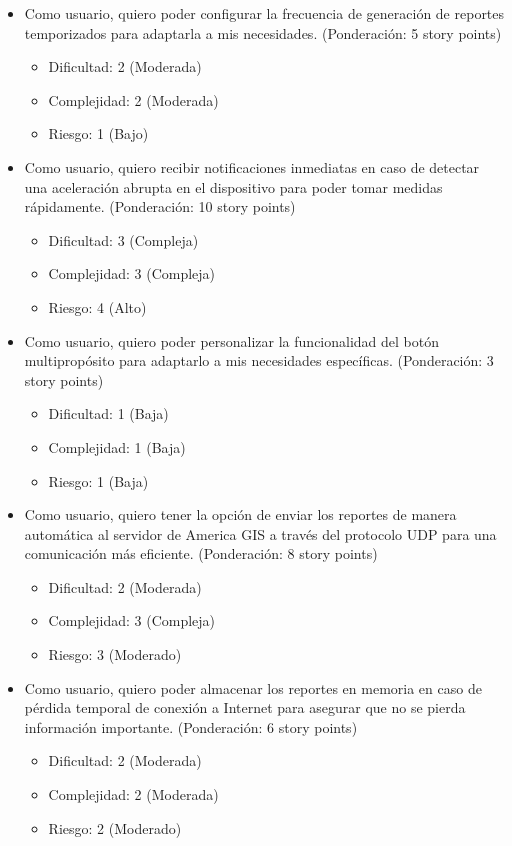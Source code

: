 \documentclass[
11pt, %
codirector, %
]{charter}
\begin{document}
\begin{itemize}
    \item Como usuario, quiero poder configurar la frecuencia de generación de reportes temporizados para adaptarla a mis necesidades. (Ponderación: 5 story points)
    \begin{itemize}
        \item Dificultad: 2 (Moderada)
        \item Complejidad: 2 (Moderada)
        \item Riesgo: 1 (Bajo)
    \end{itemize}    
    
    \item Como usuario, quiero recibir notificaciones inmediatas en caso de detectar una aceleración abrupta en el dispositivo para poder tomar medidas rápidamente. (Ponderación: 10 story points)
    \begin{itemize}
        \item Dificultad: 3 (Compleja)
        \item Complejidad: 3 (Compleja)
        \item Riesgo: 4 (Alto)
    \end{itemize}    

    
    \item Como usuario, quiero poder personalizar la funcionalidad del botón multipropósito para adaptarlo a mis necesidades específicas. (Ponderación: 3 story points)
    \begin{itemize}
        \item Dificultad: 1 (Baja)
        \item Complejidad: 1 (Baja)
        \item Riesgo: 1 (Baja)
    \end{itemize}    

    
    \item Como usuario, quiero tener la opción de enviar los reportes de manera automática al servidor de America GIS a través del protocolo UDP para una comunicación más eficiente. (Ponderación: 8 story points)
    \begin{itemize}
        \item Dificultad: 2 (Moderada)
        \item Complejidad: 3 (Compleja)
        \item Riesgo: 3 (Moderado)
    \end{itemize}  
    
    \item Como usuario, quiero poder almacenar los reportes en memoria en caso de pérdida temporal de conexión a Internet para asegurar que no se pierda información importante. (Ponderación: 6 story points)
    \begin{itemize}
        \item Dificultad: 2 (Moderada)
        \item Complejidad: 2 (Moderada)
        \item Riesgo: 2 (Moderado)
    \end{itemize}  


\end{itemize}
\end{document}
